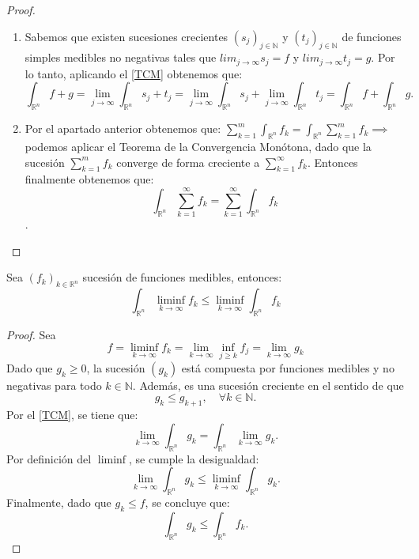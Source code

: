 \begin{proof}
    \leavevmode
    \begin{enumerate}
        \item Sabemos que existen sucesiones crecientes \( (s_j)_{j \in \mathbb{N}} \) y \(
              (t_j)_{j \in \mathbb{N}} \) de funciones simples medibles no negativas tales
              que $lim_{j \to \infty} s_j = f$ y $lim_{j \to \infty} t_j = g$. Por lo tanto,
              aplicando el \cref{TCM} obtenemos que: $$ \int_{\mathbb{R}^n}f+g = \lim_{j\to
                      \infty}\int_{\mathbb{R}^n}s_j + t_j = \lim_{j\to \infty}\int_{\mathbb{R}^n}s_j
                  + \lim_{j\to \infty}\int_{\mathbb{R}^n}t_j = \int_{\mathbb{R}^n}f +
                  \int_{\mathbb{R}^n}g. $$
        \item  Por el apartado anterior obtenemos que: $\sum_{k = 1}^{m}\int_{\mathbb{R}^n}f_k
                  = \int_{\mathbb{R}^n}\sum_{k = 1}^{m}f_k \implies$ podemos aplicar el Teorema
              de la Convergencia Monótona, dado que la sucesión $\sum_{k = 1}^{m}f_k $
              converge de forma creciente a $\sum_{k = 1}^{\infty}f_k$. Entonces finalmente
              obtenemos que: $$\int_{\mathbb{R}^n}\sum_{k = 1}^{\infty}f_k = \sum_{k =
                      1}^{\infty}\int_{\mathbb{R}^n}f_k$$.
    \end{enumerate}
\end{proof}
\begin{lema}
    Sea $(f_k)_{k\in\mathbb{R}^n}$ sucesión de funciones medibles, entonces: $$\int_{\mathbb{R}^n}\liminf_{k\to\infty}f_k \leq \liminf_{k\to\infty}\int_{\mathbb{R}^n}f_k$$
\end{lema}
\begin{proof}
    Sea $$ f = \liminf_{k \to \infty} f_k = \lim_{k \to \infty} \inf_{j \geq k} f_j = \lim_{k \to \infty} g_k $$
    Dado que $ g_k \geq 0 $, la sucesión $ (g_k) $ está compuesta por funciones medibles y no negativas para todo $ k \in \mathbb{N} $. Además, es una sucesión creciente en el sentido de que
    $$ g_k \leq g_{k+1}, \quad \forall k \in \mathbb{N}. $$ Por el \cref{TCM}, se tiene que:
    $$ \lim_{k \to \infty} \int_{\mathbb{R}^n} g_k = \int_{\mathbb{R}^n} \lim_{k \to \infty} g_k.$$ Por definición del $ \liminf $, se cumple la desigualdad:
    $$\lim_{k \to \infty} \int_{\mathbb{R}^n} g_k \leq \liminf_{k \to \infty} \int_{\mathbb{R}^n} g_k.$$
    Finalmente, dado que $ g_k \leq f $, se concluye que:
    $$\int_{\mathbb{R}^n} g_k \leq \int_{\mathbb{R}^n} f_k.$$
\end{proof}
